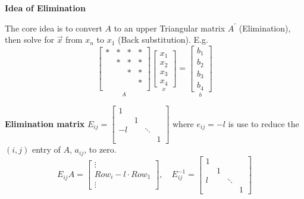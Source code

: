 \documentclass[14pt]{article}
\theoremstyle{definition}
\theoremstyle{remark}
\begin{document}
\begin{multicols}{2}
\begin{itemize}
    \end{itemize}

    \textbf{Idea of Elimination}

    The core idea is to convert $A$ to an upper Triangular matrix $A^{\prime}$ (Elimination), then solve for $\vec{x}$ from $x_n$ to $x_1$ (Back substitution). E.g.
    \[
        \underset{A}{\begin{bmatrix}
                * & * & * & * \\
                  & * & * & * \\
                  &   & * & * \\
                  &   &   & * \\
            \end{bmatrix}} \underset{x}{\begin{bmatrix}
                x_1 \\
                x_2 \\
                x_3 \\
                x_4
            \end{bmatrix}} = \underset{b}{\begin{bmatrix}
                b_1 \\
                b_2 \\
                b_3 \\
                b_4
            \end{bmatrix}}
    \]

    \textbf{Elimination matrix}
    $E_{ij}=\begin{bmatrix}
            1  &   &        &   \\
               & 1 &        &   \\
            -l &   & \ddots &   \\
               &   &        & 1
        \end{bmatrix}$ where $e_{ij} = -l$ is use to reduce the $(i, j)$ entry of $A$, $a_{ij}$, to zero.
    $$E_{ij} A=\begin{bmatrix}
            \vdots              \\
            Row_i-l \cdot Row_1 \\
            \vdots
        \end{bmatrix}, \quad E_{ij}^{-1} = \begin{bmatrix}
            1 &   &        &   \\
              & 1 &        &   \\
            l &   & \ddots &   \\
              &   &        & 1
        \end{bmatrix}
    $$


\end{multicols}
\end{document}
